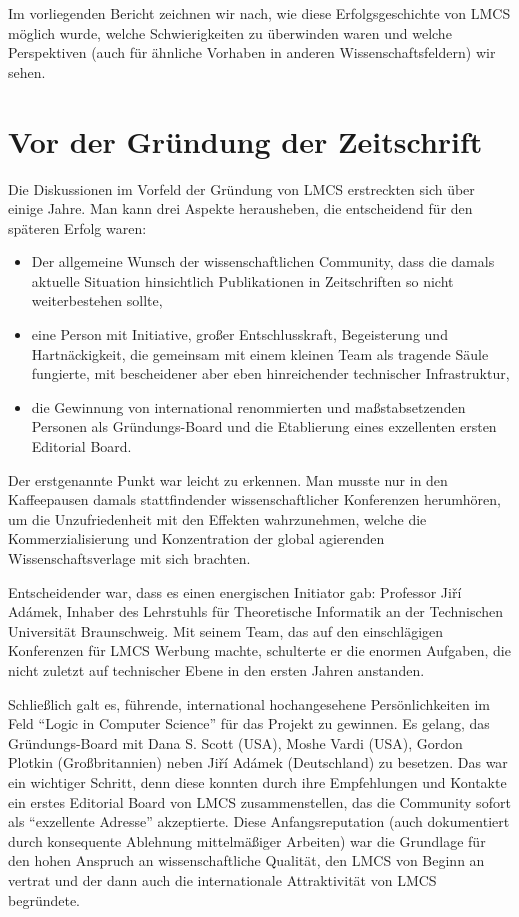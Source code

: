 \documentclass[a4paper,
fontsize=11pt,
oneside,
numbers=noperiodatend,
parskip=half-,
bibliography=totoc,
final
]{scrartcl}
\begin{document}
Im vorliegenden Bericht zeichnen wir nach, wie diese Erfolgsgeschichte
von LMCS möglich wurde, welche Schwierigkeiten zu überwinden waren und
welche Perspektiven (auch für ähnliche Vorhaben in anderen
Wissenschaftsfeldern) wir sehen.

\hypertarget{vor-der-gruxfcndung-der-zeitschrift}{%
\section{Vor der Gründung der
Zeitschrift}\label{vor-der-gruxfcndung-der-zeitschrift}}

Die Diskussionen im Vorfeld der Gründung von LMCS erstreckten sich über
einige Jahre. Man kann drei Aspekte herausheben, die entscheidend für
den späteren Erfolg waren:

\begin{itemize}
\tightlist
\item
  Der allgemeine Wunsch der wissenschaftlichen Community, dass die
  damals aktuelle Situation hinsichtlich Publikationen in Zeitschriften
  so nicht weiterbestehen sollte,
\item
  eine Person mit Initiative, großer Entschlusskraft, Begeisterung und
  Hartnäckigkeit, die gemeinsam mit einem kleinen Team als tragende
  Säule fungierte, mit bescheidener aber eben hinreichender technischer
  Infrastruktur,
\item
  die Gewinnung von international renommierten und maßstabsetzenden
  Personen als Grün\-dungs-Board und die Etablierung eines exzellenten
  ersten Editorial Board.
\end{itemize}

Der erstgenannte Punkt war leicht zu erkennen. Man musste nur in den
Kaffeepausen damals stattfindender wissenschaftlicher Konferenzen
herumhören, um die Unzufriedenheit mit den Effekten wahrzunehmen, welche
die Kommerzialisierung und Konzentration der global agierenden
Wissenschaftsverlage mit sich brachten.

Entscheidender war, dass es einen energischen Initiator gab: Professor
Jiří Adámek, Inhaber des Lehrstuhls für Theoretische Informatik an der
Technischen Universität Braunschweig. Mit seinem Team, das auf den
einschlägigen Konferenzen für LMCS Werbung machte, schulterte er die
enormen Aufgaben, die nicht zuletzt auf technischer Ebene in den ersten
Jahren anstanden.

Schließlich galt es, führende, international hochangesehene
Persönlichkeiten im Feld \enquote{Logic in Computer Science} für das
Projekt zu gewinnen. Es gelang, das Gründungs-Board mit Dana S. Scott
(USA), Moshe Vardi (USA), Gordon Plotkin (Großbritannien) neben Jiří
Adámek (Deutschland) zu besetzen. Das war ein wichtiger Schritt, denn
diese konnten durch ihre Empfehlungen und Kontakte ein erstes Editorial
Board von LMCS zusammenstellen, das die Community sofort als
\enquote{exzellente Adresse} akzeptierte. Diese Anfangsreputation (auch
dokumentiert durch konsequente Ablehnung mittelmäßiger Arbeiten) war die
Grundlage für den hohen Anspruch an wissenschaftliche Qualität, den LMCS
von Beginn an vertrat und der dann auch die internationale Attraktivität
von LMCS begründete.
\end{document}
